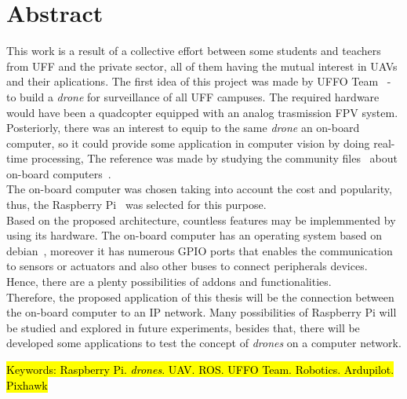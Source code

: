 \documentclass[12pt,a4paper,oneside]{book}
\begin{document}



\chapter*{Abstract}
%
%
\thispagestyle{myheadings}
%
This work is a result of a collective effort between some students and teachers from UFF and the private sector, all of them having the mutual interest in UAVs and  their aplications. The first idea of this project was made by UFFO Team~\cite{url:equipeuffo} - to build a \textit{drone} for surveillance of all UFF campuses. The required hardware would have been a quadcopter equipped with an analog trasmission FPV system. Posteriorly, there was an interest to equip to the same \textit{drone} an on-board computer, so it could provide some application in computer vision by doing real-time processing, The reference was made by studying the community files~\cite{url:ardupilotdoc} about on-board computers~\cite{url:ardupilot-companioncomputers}.\\
%
The on-board computer was chosen taking into account the cost and popularity, thus, the Raspberry Pi~\cite{url:raspberrypi} was selected for this purpose.\\
%
Based on the proposed architecture, countless features may be implemmented by using its hardware. The on-board computer has an operating system based on debian~\cite{url:debian}, moreover it has numerous GPIO ports that enables the communication to sensors or actuators and also other buses to connect peripherals devices. Hence, there are a plenty possibilities of addons and functionalities.\\ 
%
Therefore, the proposed application of this thesis will be the connection between the on-board computer to an IP network. Many possibilities of Raspberry Pi will be studied and explored in future experiments, besides that, there will be developed some applications to test the concept of \textit{drones} on a computer network.

\bigskip

\hl{ Keywords: Raspberry Pi. \textit{drones}. UAV. ROS. UFFO Team. Robotics. Ardupilot. Pixhawk}

\newpage
\end{document}
